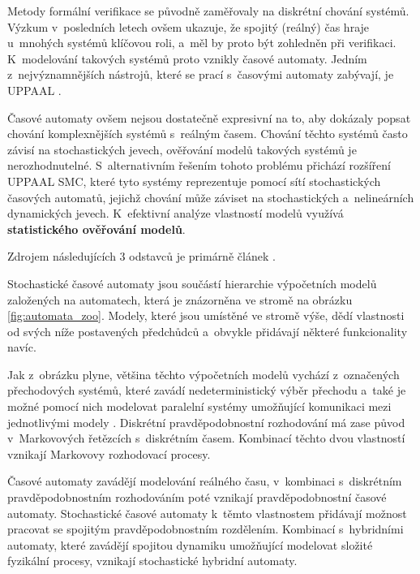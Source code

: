 Metody formální verifikace se původně zaměřovaly na diskrétní chování systémů. Výzkum v~posledních letech ovšem ukazuje, že spojitý (reálný) čas hraje u~mnohých systémů klíčovou roli, a~měl by proto být zohledněn při verifikaci. K~modelování takových systémů proto vznikly časové automaty. Jedním z~nejvýznamnějších nástrojů, které se prací s~časovými automaty zabývají, je UPPAAL \cite{uppaal_smc}.

Časové automaty ovšem nejsou dostatečně expresivní na to, aby dokázaly popsat chování komplexnějších systémů s~reálným časem. Chování těchto systémů často závisí na stochastických jevech, ověřování modelů takových systémů je nerozhodnutelné. S~alternativním řešením tohoto problému přichází rozšíření UPPAAL SMC, které tyto systémy reprezentuje pomocí sítí stochastických časových automatů, jejichž chování může záviset na stochastických a~nelineárních dynamických jevech. K~efektivní analýze vlastností modelů využívá \textbf{statistického ověřování modelů}.

Zdrojem následujících 3 odstavců je primárně článek \cite{automata_zoo}. 

Stochastické časové automaty jsou součástí hierarchie výpočetních modelů založených na automatech, která je znázorněna ve stromě na obrázku \ref{fig:automata_zoo}. Modely, které jsou umístěné ve stromě výše, dědí vlastnosti od svých níže postavených předchůdců a~obvykle přidávají některé funkcionality navíc.

Jak z~obrázku plyne, většina těchto výpočetních modelů vychází z~označených přechodových systémů, které zavádí nedeterministický výběr přechodu a~také je možné pomocí nich modelovat paralelní systémy umožňující komunikaci mezi jednotlivými modely \cite{mc_principles}. Diskrétní pravděpodobnostní rozhodování má zase původ v~Markovových řetězcích s~diskrétním časem. Kombinací těchto dvou vlastností vznikají Markovovy rozhodovací procesy. 

Časové automaty zavádějí modelování reálného času, v~kombinaci s~diskrétním pravděpodobnostním rozhodováním poté vznikají pravděpodobnostní časové automaty. Stochastické časové automaty k~těmto vlastnostem přidávají možnost pracovat se spojitým pravděpodobnostním rozdělením. Kombinací s~hybridními automaty, které zavádějí spojitou dynamiku umožňující modelovat složité fyzikální procesy, vznikají stochastické hybridní automaty.

